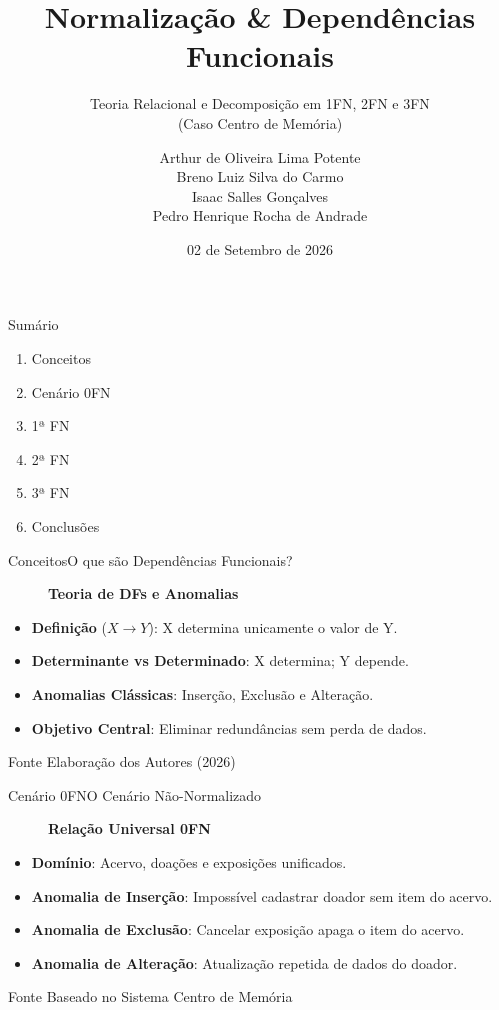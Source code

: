 \documentclass[10pt,aspectratio=169]{beamer}
\title{Normalização \& Dependências Funcionais}
\subtitle{Teoria Relacional e Decomposição em 1FN, 2FN e 3FN \\(Caso Centro de Memória)}
\author{
  Arthur de Oliveira Lima Potente \\
  Breno Luiz Silva do Carmo \\
  Isaac Salles Gonçalves \\
  Pedro Henrique Rocha de Andrade
}
\institute{Banco de Dados --- 6º Período \\ IFF --- Bom Jesus do Itabapoana, RJ}
\date{02 de Setembro de 2026}
\begin{document}
\begin{frame}
  \titlepage
\end{frame}

\begin{frame}{Sumário}
  \begin{enumerate}
    \item Conceitos
    \item Cenário 0FN
    \item 1ª FN
    \item 2ª FN
    \item 3ª FN
    \item Conclusões
  \end{enumerate}
\end{frame}

\begin{frame}{Conceitos}{O que são Dependências Funcionais?}
  \begin{figure}
    \centering
    \textbf{Teoria de DFs e Anomalias}
  \end{figure}
  \vspace{0.3cm}
  \begin{itemize}
    \item \textbf{Definição} ($X \to Y$): X determina unicamente o valor de Y.
    \item \textbf{Determinante vs Determinado}: X determina; Y depende.
    \item \textbf{Anomalias Clássicas}: Inserção, Exclusão e Alteração.
    \item \textbf{Objetivo Central}: Eliminar redundâncias sem perda de dados.
  \end{itemize}
  \vspace{0.2cm}
  \begin{block}{Fonte}
    Elaboração dos Autores (2026)
  \end{block}
\end{frame}

\begin{frame}{Cenário 0FN}{O Cenário Não-Normalizado}
  \begin{figure}
    \centering
    \textbf{Relação Universal 0FN}
  \end{figure}
  \vspace{0.3cm}
  \begin{itemize}
    \item \textbf{Domínio}: Acervo, doações e exposições unificados.
    \item \textbf{Anomalia de Inserção}: Impossível cadastrar doador sem item do acervo.
    \item \textbf{Anomalia de Exclusão}: Cancelar exposição apaga o item do acervo.
    \item \textbf{Anomalia de Alteração}: Atualização repetida de dados do doador.
  \end{itemize}
  \vspace{0.2cm}
  \begin{block}{Fonte}
    Baseado no Sistema Centro de Memória
  \end{block}
\end{frame}
\end{document}
